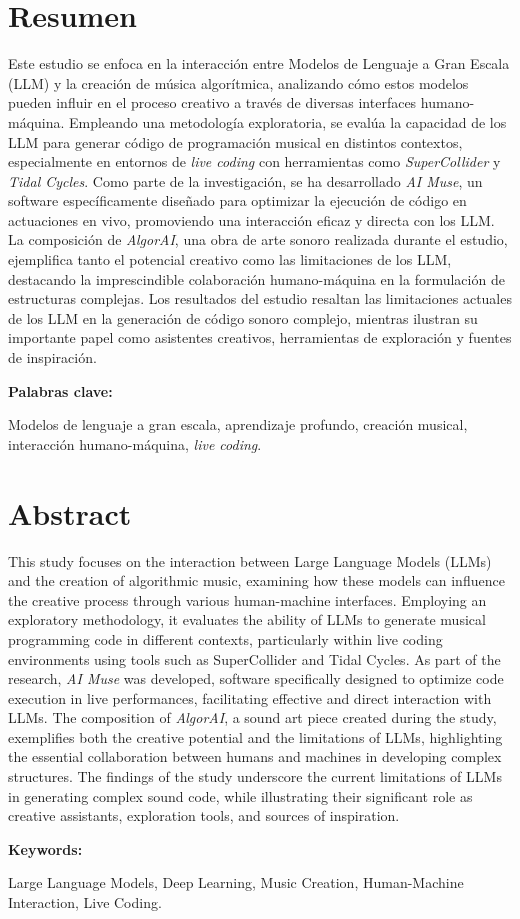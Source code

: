   \clearpage
  \chapter*{Resumen}

  Este estudio se enfoca en la interacción entre Modelos de Lenguaje a Gran Escala (LLM) y la creación de música algorítmica, analizando cómo estos modelos pueden influir en el proceso creativo a través de diversas interfaces humano-máquina. Empleando una metodología exploratoria, se evalúa la capacidad de los LLM para generar código de programación musical en distintos contextos, especialmente en entornos de \emph{live coding} con herramientas como \emph{SuperCollider} y \emph{Tidal Cycles}. Como parte de la investigación, se ha desarrollado \emph{AI Muse}, un software específicamente diseñado para optimizar la ejecución de código en actuaciones en vivo, promoviendo una interacción eficaz y directa con los LLM. La composición de \emph{AlgorAI}, una obra de arte sonoro realizada durante el estudio, ejemplifica tanto el potencial creativo como las limitaciones de los LLM, destacando la imprescindible colaboración humano-máquina en la formulación de estructuras complejas. Los resultados del estudio resaltan las limitaciones actuales de los LLM en la generación de código sonoro complejo, mientras ilustran su importante papel como asistentes creativos, herramientas de exploración y fuentes de inspiración.
  


  \vspace{1cm}
  \textbf{Palabras clave:} %

  Modelos de lenguaje a gran escala, aprendizaje profundo, creación musical, interacción humano-máquina, \emph{live coding}.


    \clearpage
    \chapter*{Abstract}
  
    This study focuses on the interaction between Large Language Models (LLMs) and the creation of algorithmic music, examining how these models can influence the creative process through various human-machine interfaces. Employing an exploratory methodology, it evaluates the ability of LLMs to generate musical programming code in different contexts, particularly within live coding environments using tools such as SuperCollider and Tidal Cycles. As part of the research, \emph{AI Muse} was developed, software specifically designed to optimize code execution in live performances, facilitating effective and direct interaction with LLMs. The composition of \emph{AlgorAI}, a sound art piece created during the study, exemplifies both the creative potential and the limitations of LLMs, highlighting the essential collaboration between humans and machines in developing complex structures. The findings of the study underscore the current limitations of LLMs in generating complex sound code, while illustrating their significant role as creative assistants, exploration tools, and sources of inspiration.

    
    \vspace{1cm}
    \textbf{Keywords:} %
    
    Large Language Models, Deep Learning, Music Creation, Human-Machine Interaction, Live Coding.
  